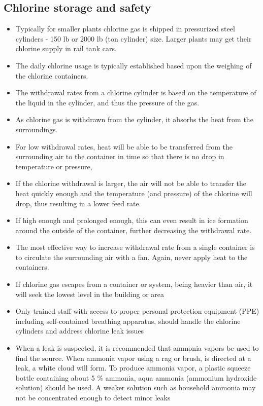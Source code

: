\subsection{Chlorine storage and safety}

\begin{itemize}
	\item Typically for smaller plants chlorine gas is shipped in  pressurized steel cylinders - 150 lb or 2000 lb (ton cylinder) size.  Larger plants may get their chlorine supply in rail tank cars.  
	\item The daily chlorine usage is typically established based upon the weighing of the chlorine containers.
	\item The withdrawal rates from a chlorine cylinder is based on the temperature of the liquid in the cylinder, and thus the pressure of the gas. 
	\item As chlorine gas is withdrawn from the cylinder, it absorbs the heat from the surroundings.
	\item For low withdrawal rates, heat will be able to be transferred from the surrounding air to the container in time so that there is no drop in temperature or pressure, 
	\item If the chlorine withdrawal is larger, the air will not be able to transfer the heat quickly enough and the temperature (and pressure) of the chlorine will drop, thus resulting in a lower feed rate. 
	\item If high enough and prolonged enough, this can even result in ice formation around the outside of the container, further decreasing the withdrawal rate. 
	\item The most effective way to increase withdrawal rate from a single container is to circulate the surrounding air with a fan. Again, never apply heat to the containers.
	\item If chlorine gas escapes from a container or system, being heavier than air, it will seek the lowest level in the building or area
	\item Only trained staff with access to proper personal protection equipment (PPE) including self-contained breathing apparatus, should handle the chlorine cylinders and address chlorine leak issues 
	\item When a leak is suspected, it is recommended that ammonia vapors be used to find the source. When ammonia vapor using a rag or brush, is directed at a leak, a white cloud will form. To produce ammonia vapor, a plastic squeeze bottle containing about 5 \% ammonia, aqua ammonia (ammonium hydroxide solution) should be used. A weaker solution such as household ammonia may not be concentrated enough to detect minor leaks

\end{itemize}
